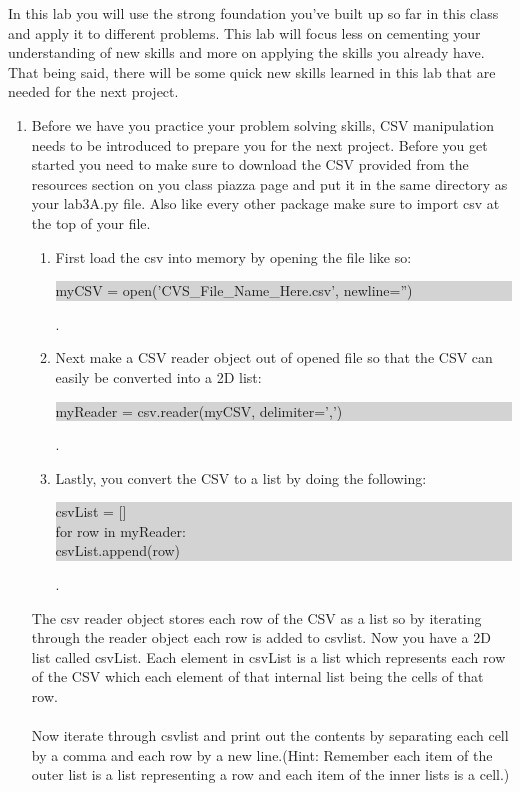 \documentclass[11pt, letterpaper, onecolumn, oneside, final]{article}
\begin{document}
\maketitle


In this lab you will use the strong foundation you've built up so far in this class and apply it to different problems. This lab will focus less on cementing your understanding of new skills and more on applying the skills you already have. That being said, there will be some quick new skills learned in this lab that are needed for the next project.


\begin{enumerate}
    \item Before we have you practice your problem solving skills, CSV manipulation needs to be introduced to prepare you for the next project. Before you get started you need to make sure to download the CSV provided from the resources section on you class piazza page and put it in the same directory as your {\consolas lab3A.py} file. Also like every other package make sure to {\consolas import csv} at the top of your file. 
    \begin{enumerate}
        \item First load the csv into memory by opening the file like so:
        \begin{center}
 \colorbox{lightgray}{\parbox{.64\textwidth}{\consolas myCSV = open('CVS\_File\_Name\_Here.csv', newline='')}}.
        \end{center}
        \item Next make a CSV reader object out of opened file so that the CSV can easily be converted into a 2D list:
        \begin{center}
\colorbox{lightgray}{\parbox{.55\textwidth}{\consolas myReader = csv.reader(myCSV, delimiter=',')}}.
        \end{center}
        \item Lastly, you convert the CSV to a list by doing the following:
        \begin{center}
 \colorbox{lightgray}{\parbox{.3\textwidth}{\consolas
            csvList = []\\
            for row in myReader:\\ \hspace*{8mm}csvList.append(row)
        }}.
        \end{center}
    \end{enumerate}
    The csv reader object stores each row of the CSV as a list so by iterating through the reader object each row is added to csvlist. Now you have a 2D list called {\consolas csvList}. Each element in {\consolas csvList} is a list which represents each row of the CSV which each element of that internal list being the cells of that row.\\\\
    Now iterate through csvlist and print out the contents by separating each cell by a comma and each row by a new line.(Hint: Remember each item of the outer list is a list representing a row and each item of the inner lists is a cell.)
    

\end{enumerate}
\end{document}
